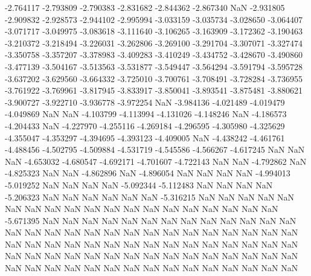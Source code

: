 -2.764117
-2.793809
-2.790383
-2.831682
-2.844362
-2.867340
NaN
-2.931805
-2.909832
-2.928573
-2.944102
-2.995994
-3.033159
-3.035734
-3.028650
-3.064407
-3.071717
-3.049975
-3.083618
-3.111640
-3.106265
-3.163909
-3.172362
-3.190463
-3.210372
-3.218494
-3.226031
-3.262806
-3.269100
-3.291704
-3.307071
-3.327474
-3.350758
-3.357207
-3.378983
-3.409283
-3.410249
-3.434752
-3.428670
-3.490860
-3.477139
-3.504167
-3.513563
-3.531877
-3.549447
-3.564294
-3.591794
-3.595728
-3.637202
-3.629560
-3.664332
-3.725010
-3.700761
-3.708491
-3.728284
-3.736955
-3.761922
-3.769961
-3.817945
-3.833917
-3.850041
-3.893541
-3.875481
-3.880621
-3.900727
-3.922710
-3.936778
-3.972254
NaN
-3.984136
-4.021489
-4.019479
-4.049869
NaN
NaN
-4.103799
-4.113994
-4.131026
-4.148246
NaN
-4.186573
-4.204433
NaN
-4.227970
-4.255116
-4.269184
-4.296595
-4.305980
-4.325629
-4.355047
-4.353297
-4.394695
-4.393123
-4.409005
NaN
-4.438242
-4.461761
-4.488456
-4.502795
-4.509884
-4.531719
-4.545586
-4.566267
-4.617245
NaN
NaN
NaN
-4.653032
-4.680547
-4.692171
-4.701607
-4.722143
NaN
NaN
-4.792862
NaN
-4.825323
NaN
NaN
-4.862896
NaN
-4.896054
NaN
NaN
NaN
NaN
-4.994013
-5.019252
NaN
NaN
NaN
NaN
-5.092344
-5.112483
NaN
NaN
NaN
NaN
-5.206323
NaN
NaN
NaN
NaN
NaN
NaN
-5.316215
NaN
NaN
NaN
NaN
NaN
NaN
NaN
NaN
NaN
NaN
NaN
NaN
NaN
NaN
NaN
NaN
NaN
NaN
NaN
-5.671395
NaN
NaN
NaN
NaN
NaN
NaN
NaN
NaN
NaN
NaN
NaN
NaN
NaN
NaN
NaN
NaN
NaN
NaN
NaN
NaN
NaN
NaN
NaN
NaN
NaN
NaN
NaN
NaN
NaN
NaN
NaN
NaN
NaN
NaN
NaN
NaN
NaN
NaN
NaN
NaN
NaN
NaN
NaN
NaN
NaN
NaN
NaN
NaN
NaN
NaN
NaN
NaN
NaN
NaN
NaN
NaN
NaN
NaN
NaN
NaN
NaN
NaN
NaN
NaN
NaN
NaN
NaN
NaN
NaN
NaN
NaN
NaN
NaN
